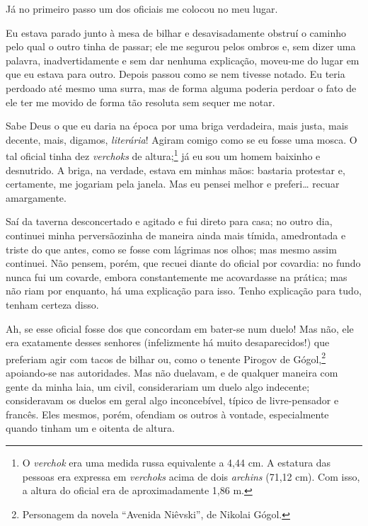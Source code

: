 Já no primeiro passo um dos oficiais me colocou no meu lugar.

Eu estava parado junto à mesa de bilhar e desavisadamente obstruí o
caminho pelo qual o outro tinha de passar; ele me segurou pelos ombros
e, sem dizer uma palavra, inadvertidamente e sem dar nenhuma
explicação, moveu-me do lugar em que eu estava para outro. Depois
passou como se nem tivesse notado. Eu teria perdoado até mesmo uma
surra, mas de forma alguma poderia perdoar o fato de ele ter me movido
de forma tão resoluta sem sequer me notar.

Sabe Deus o que eu daria na época por uma briga verdadeira, mais justa,
mais decente, mais, digamos, \textit{literária}! Agiram comigo como se
eu fosse uma mosca. O tal oficial tinha dez \textit{verchoks} de
altura;\footnote{ O \textit{verchok} era uma medida russa equivalente a
4,44 cm. A estatura das pessoas era expressa em \textit{verchoks} acima
de dois \textit{archins} (71,12 cm). Com isso, a altura do oficial era
de aproximadamente 1,86 m.} já eu sou um homem baixinho e desnutrido. A
briga, na verdade, estava em minhas mãos: bastaria protestar e,
certamente, me jogariam pela janela. Mas eu pensei melhor e preferi\ldots{}
recuar amargamente.

Saí da taverna desconcertado e agitado e fui direto para casa; no outro
dia, continuei minha perversãozinha de maneira ainda mais tímida,
amedrontada e triste do que antes, como se fosse com lágrimas nos
olhos; mas mesmo assim continuei. Não pensem, porém, que recuei diante
do oficial por covardia: no fundo nunca fui um covarde, embora
constantemente me acovardasse na prática; mas não riam por enquanto, há
uma explicação para isso. Tenho explicação para tudo, tenham certeza
disso.

Ah, se esse oficial fosse dos que concordam em bater-se num duelo! Mas
não, ele era exatamente desses senhores (infelizmente há muito
desaparecidos!) que preferiam agir com tacos de bilhar ou, como o
tenente Pirogov de Gógol,\footnote{ Personagem da novela “Avenida
Niêvski”, de Nikolai Gógol.} apoiando-se nas autoridades. Mas não
duelavam, e de qualquer maneira com gente da minha laia, um civil,
considerariam um duelo algo indecente; consideravam os duelos em geral
algo inconcebível, típico de livre-pensador e francês. Eles mesmos,
porém, ofendiam os outros à vontade, especialmente quando tinham um e
oitenta de altura.

